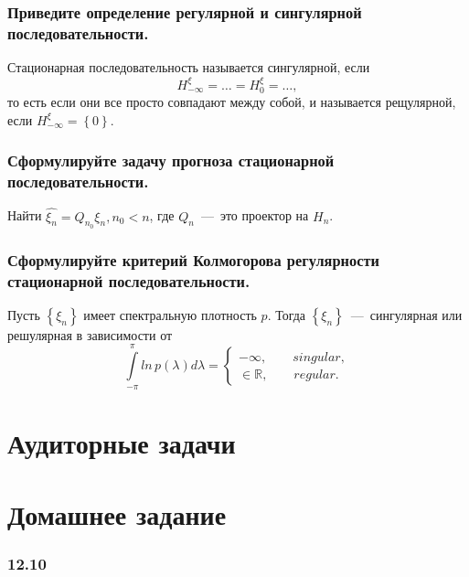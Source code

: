 \subsubsection*{Приведите определение регулярной и сингулярной последовательности.}

Стационарная последовательность называется сингулярной, если
\begin{equation*}
  H_{-\infty }^{ \xi } =
  \dotsc =
  H_0^{ \xi } =
  \dotsc,
\end{equation*}
то есть если они все просто совпадают между собой, и называется рещулярной,
если $H_{-\infty }^{ \xi } = \left\{ 0 \right\} $.

\subsubsection*{Сформулируйте задачу прогноза стационарной последовательности.}

Найти $ \hat{ \xi_n} = Q_{n_0} \xi_n, n_0 < n$, где $Q_n$~---~это проектор на $H_n$.

\subsubsection*{Сформулируйте критерий Колмогорова регулярности стационарной последовательности.}

Пусть $ \left\{ \xi_n \right\} $ имеет спектральную плотность $p$.
Тогда $ \left\{ \xi_n \right\} $~---~сингулярная или решулярная в зависимости от
\begin{equation*}
  \int \limits_{-\pi }^{ \pi } ln \, p \left( \lambda \right) d \lambda =
  \begin{cases}
    -\infty, \qquad singular, \\
    \in \mathbb{R}, \qquad regular.
  \end{cases}
\end{equation*}

\section*{Аудиторные задачи}

\section*{Домашнее задание}

\subsubsection*{12.10}

